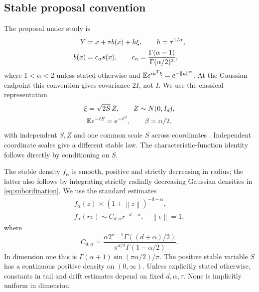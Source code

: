 \documentclass[pdflatex,iicol,sn-mathphys-ay]{sn-jnl}
\theoremstyle{definition}\newtheorem{definition}[theorem]{Definition}
\theoremstyle{remark}\newtheorem{remark}[theorem]{Remark}
\numberwithin{equation}{section}
\newcommand{\norm}[1]{\left\lVert#1\right\rVert}\newcommand{\TV}{\mathrm{TV}}
\newcommand{\1}{\mathbf 1}
\begin{document}
\subsection{Stable proposal convention}
The proposal under study is
\begin{equation}
\begin{aligned}
Y&=x+\tau b(x)+h\xi,\qquad h=\tau^{1/\alpha},\\
b(x)&=c_\alpha s(x),\qquad
c_\alpha=\frac{\Gamma(\alpha-1)}{\Gamma(\alpha/2)^2},
\end{aligned}\label{eq:proposal}
\end{equation}
where $1<\alpha<2$ unless stated otherwise and
$\E e^{iu^T\xi}=e^{-\norm u^\alpha}$. At the Gaussian endpoint this convention gives covariance $2I$, not $I$. We use the classical representation
\begin{equation}
\begin{gathered}
\xi=\sqrt{2S}\,Z,\qquad Z\sim N(0,I_d),\\
\mathbb E e^{-tS}=e^{-t^\beta},\qquad \beta=\alpha/2,
\end{gathered}\label{eq:subordination}
\end{equation}
with independent $S,Z$ and one common scale $S$ across coordinates \citep{kanter}. Independent coordinate scales give a different stable law. The characteristic-function identity follows directly by conditioning on $S$.

The stable density $f_\alpha$ is smooth, positive and strictly decreasing in radius; the latter also follows by integrating strictly radially decreasing Gaussian densities in \eqref{eq:subordination}. We use the standard estimates \citep{cygan}
\begin{equation}
\begin{gathered}
f_\alpha(z)\asymp(1+\norm z)^{-d-\alpha},\\
f_\alpha(re)\sim C_{d,\alpha}r^{-d-\alpha},\quad \norm e=1,
\end{gathered}\label{eq:stabletail}
\end{equation}
where
\begin{equation}
C_{d,\alpha}=
\frac{\alpha 2^{\alpha-1}\Gamma((d+\alpha)/2)}
{\pi^{d/2}\Gamma(1-\alpha/2)}.
\end{equation}
In dimension one this is $\Gamma(\alpha+1)\sin(\pi\alpha/2)/\pi$.
The positive stable variable $S$ has a continuous positive density on $(0,\infty)$. Unless explicitly stated otherwise, constants in tail and drift estimates depend on fixed $d,\alpha,\tau$. None is implicitly uniform in dimension.
\end{document}
